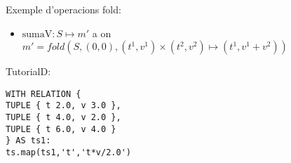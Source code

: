 Exemple d'operacions fold:
\begin{itemize}
\item $\text{sumaV}: S \mapsto m'$ a on $m'=
  fold(S,(0,0),(t^1,v^1)\times(t^2,v^2)\mapsto(t^1,v^1+v^2))$
\end{itemize}




TutorialD:
\begin{verbatim}
WITH RELATION {
TUPLE { t 2.0, v 3.0 },
TUPLE { t 4.0, v 2.0 },
TUPLE { t 6.0, v 4.0 }
} AS ts1: 
ts.map(ts1,'t','t*v/2.0')
\end{verbatim}














